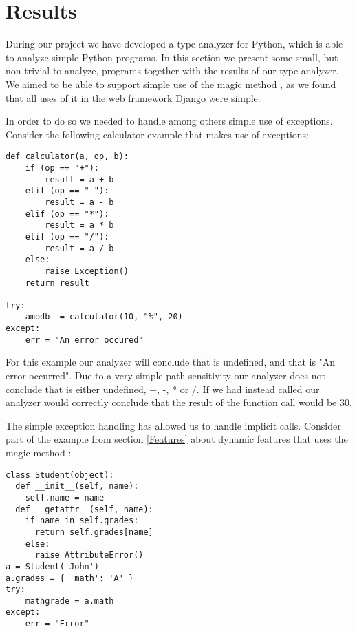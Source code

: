 \chapter{Results}
During our project we have developed a type analyzer for Python, which is able to analyze simple Python programs. In this section we present some small, but non-trivial to analyze, programs together with the results of our type analyzer. We aimed to be able to support simple use of the magic method , as we found that all uses of it in the web framework Django were simple.

In order to do so we needed to handle among others simple use of exceptions. Consider the following calculator example that makes use of exceptions:

\begin{listing}[H]
	\begin{verbatim}
def calculator(a, op, b):
	if (op == "+"):
		result = a + b
	elif (op == "-"):
		result = a - b
	elif (op == "*"):
		result = a * b
	elif (op == "/"):
		result = a / b
	else:
		raise Exception()
	return result

try:
	amodb  = calculator(10, "%", 20)
except:
	err = "An error occured"
	\end{verbatim}
\end{listing}

For this example our analyzer will conclude that  is undefined, and that  is "An error occurred". Due to a very simple path sensitivity our analyzer does not conclude that  is either undefined, +, -, * or /. If we had instead called  our analyzer would correctly conclude that the result of the function call would be 30.

The simple exception handling has allowed us to handle implicit  calls. Consider part of the  example from section \ref{Features} about dynamic features that uses the magic method :

\begin{listing}[H]
	\begin{verbatim}
class Student(object):
  def __init__(self, name):
    self.name = name
  def __getattr__(self, name):
    if name in self.grades:
      return self.grades[name]
    else:
      raise AttributeError()
a = Student('John')
a.grades = { 'math': 'A' }
try:
	mathgrade = a.math
except:
	err = "Error"
	\end{verbatim}
\end{listing}

